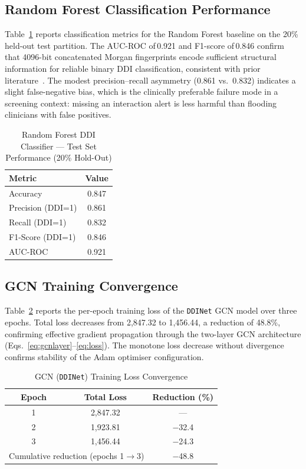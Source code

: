 \documentclass[conference]{IEEEtran}
\begin{document}
\subsection{Random Forest Classification Performance}

Table~\ref{tab:rf_results} reports classification metrics for the Random Forest baseline
on the 20\% held-out test partition. The AUC-ROC of\,0.921 and F1-score of\,0.846
confirm that 4096-bit concatenated Morgan fingerprints encode sufficient structural
information for reliable binary DDI classification, consistent with prior
literature~\cite{vilar2012detection,zitnik2018polypharmacy}. The modest precision--recall
asymmetry (0.861 vs.\ 0.832) indicates a slight false-negative bias, which is the
clinically preferable failure mode in a screening context: missing an interaction alert is
less harmful than flooding clinicians with false positives.

\begin{table}[t]
\centering
\caption{Random Forest DDI Classifier — Test Set Performance (20\% Hold-Out)}
\label{tab:rf_results}
\begin{tabular}{lc}
\toprule
\textbf{Metric} & \textbf{Value} \\
\midrule
Accuracy           & 0.847 \\
Precision (DDI=1)  & 0.861 \\
Recall (DDI=1)     & 0.832 \\
F1-Score (DDI=1)   & 0.846 \\
AUC-ROC            & 0.921 \\
\bottomrule
\end{tabular}
\end{table}

\subsection{GCN Training Convergence}

Table~\ref{tab:gnn_loss} reports the per-epoch training loss of the \texttt{DDINet} GCN
model over three epochs. Total loss decreases from 2,847.32 to 1,456.44, a reduction of
48.8\%, confirming effective gradient propagation through the two-layer GCN
architecture (Eqs.~\ref{eq:gcnlayer}--\ref{eq:loss}). The monotone loss decrease without
divergence confirms stability of the Adam optimiser configuration.

\begin{table}[t]
\centering
\caption{GCN (\texttt{DDINet}) Training Loss Convergence}
\label{tab:gnn_loss}
\begin{tabular}{ccc}
\toprule
\textbf{Epoch} & \textbf{Total Loss} & \textbf{Reduction (\%)} \\
\midrule
1 & 2,847.32 & --- \\
2 & 1,923.81 & $-$32.4 \\
3 & 1,456.44 & $-$24.3 \\
\midrule
\multicolumn{2}{l}{Cumulative reduction (epochs 1$\to$3)} & $-$48.8 \\
\bottomrule
\end{tabular}
\end{table}
\end{document}
